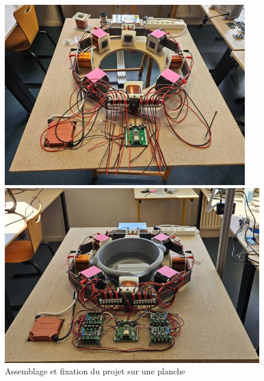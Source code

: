 \documentclass{article}
\begin{document}
\begin{figure}[H]
    \centering
    \begin{minipage}{0.45\textwidth}
    \centering
        \includegraphics[width=\linewidth, angle=0]{Images/photoFabrications/assemblage1.jpg}
    \end{minipage}\hfill
    \begin{minipage}{0.45\textwidth}
        \centering
        \includegraphics[width=\linewidth, angle=0]{Images/photoFabrications/assemblage2.jpg}
        
    \end{minipage}
    \caption{Assemblage et fixation du projet sur une planche}
    \label{fig:assemblage1}
\end{figure}
\end{document}
